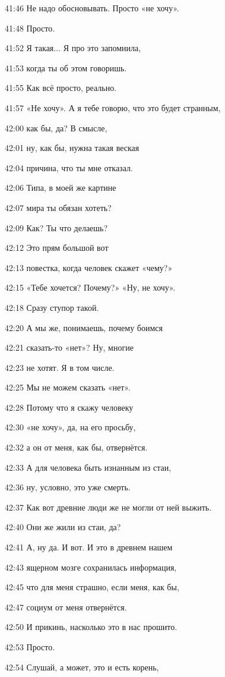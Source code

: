 41:46
Не надо обосновывать. Просто «не хочу».

41:48
Просто.

41:52
Я такая... Я про это запомнила,

41:53
когда ты об этом говоришь.

41:55
Как всё просто, реально.

41:57
«Не хочу». А я тебе говорю, что это будет странным,

42:00
как бы, да? В смысле,

42:01
ну, как бы, нужна такая веская

42:04
причина, что ты мне отказал.

42:06
Типа, в моей же картине

42:07
мира ты обязан хотеть?

42:09
Как? Ты что делаешь?

42:12
Это прям большой вот

42:13
повестка, когда человек скажет «чему?»

42:15
«Тебе хочется? Почему?» «Ну, не хочу».

42:18
Сразу ступор такой.

42:20
А мы же, понимаешь, почему боимся

42:21
сказать-то «нет»? Ну, многие

42:23
не хотят. Я в том числе.

42:25
Мы не можем сказать «нет».

42:28
Потому что я скажу человеку

42:30
«не хочу», да, на его просьбу,

42:32
а он от меня, как бы, отвернётся.

42:33
А для человека быть изнанным из стаи,

42:36
ну, условно, это уже смерть.

42:37
Как вот древние люди же не могли от ней выжить.

42:40
Они же жили из стаи, да?

42:41
А, ну да. И вот. И это в древнем нашем

42:43
ящерном мозге сохранилась информация,

42:45
что для меня страшно, если меня, как бы,

42:47
социум от меня отвернётся.

42:50
И прикинь, насколько это в нас прошито.

42:53
Просто.

42:54
Слушай, а может, это и есть корень,


